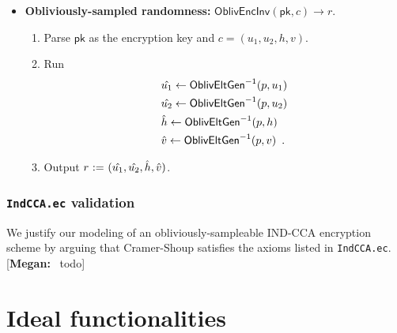 \documentclass[11pt,letterpaper]{article}
\newcommand{\doclearpage}{%
  \iffull\clearpage\else\fi
}
\newcommand{\authnote}[2]{[{\color{red}\textbf{#1:}}~{\color{blue} #2}]}
\newcommand{\authnote}[2]{}
\newcommand{\megan}[1]{\authnote{Megan}{#1}}
\theoremstyle{plain} %
\theoremstyle{definition} %
\theoremstyle{remark} %
\newcommand{\code}[1]{\texttt{#1}} %
\newcommand{\eqdef}{\ {:=} \ }
\newcommand{\OblivEncInv}{\mathsf{OblivEncInv}}
\newcommand{\EncKey}{\mathsf{pk}}
\newcommand{\Ciphertext}{c}
\newcommand{\Rand}{r}
\newcommand{\GrpEltE}{h}
\newcommand{\GrpEltU}{u}
\newcommand{\GrpEltV}{v}
\begin{document}
\begin{itemize}[nolistsep]
    \item \textbf{Obliviously-sampled randomness:} $\OblivEncInv(\EncKey, \Ciphertext) \to \Rand$.
    \begin{enumerate}[nolistsep]
        \item Parse $\EncKey$ as the encryption key and $\Ciphertext = (\GrpEltU_1,\GrpEltU_2,\GrpEltE,\GrpEltV)$.
        \item Run
        \begin{align*}
            &\Inv{\GrpEltU_1} \gets \OblivEltInv(\MultGrpOrd,\GrpEltU_1)\\
            &\Inv{\GrpEltU_2} \gets \OblivEltInv(\MultGrpOrd,\GrpEltU_2)\\
            &\Inv{\GrpEltE} \gets \OblivEltInv(\MultGrpOrd,\GrpEltE)\\
            &\Inv{\GrpEltV} \gets \OblivEltInv(\MultGrpOrd,\GrpEltV)
            \enspace.
        \end{align*}
        \item Output $\Rand \eqdef (\Inv{\GrpEltU_1}, \Inv{\GrpEltU_2}, \Inv{\GrpEltE}, \Inv{\GrpEltV})$.
    \end{enumerate}
\end{itemize}

\subsubsection{\code{IndCCA.ec} validation}
\label{sec:indcca-model-validation}

We justify our modeling of an obliviously-sampleable IND-CCA encryption scheme by arguing that Cramer-Shoup satisfies the axioms listed in \code{IndCCA.ec}.
\megan{todo}
\doclearpage
\section{Ideal functionalities}
\label{sec:ideal-functionalities}

\end{document}
